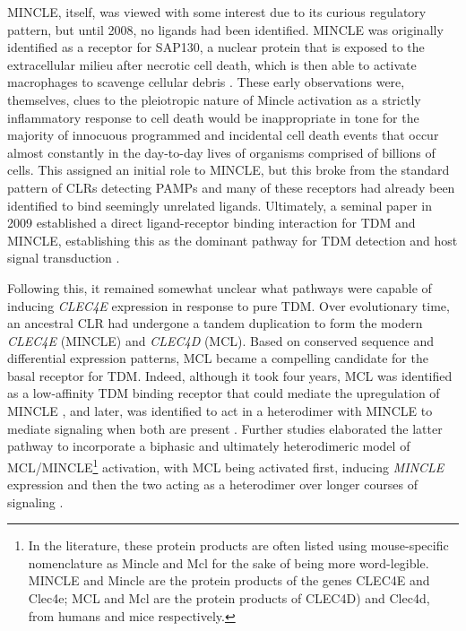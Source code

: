 MINCLE, itself, was viewed with some interest due to its curious regulatory pattern, but until 2008, no ligands had been identified. MINCLE was originally identified as a receptor for SAP130, a nuclear protein that is exposed to the extracellular milieu after necrotic cell death, which is then able to activate macrophages to scavenge cellular debris \citep{Yamasaki2008}. These early observations were, themselves, clues to the pleiotropic nature of Mincle activation as a strictly inflammatory response to cell death would be inappropriate in tone for the majority of innocuous programmed and incidental cell death events that occur almost constantly in the day-to-day lives of organisms comprised of billions of cells. This assigned an initial role to MINCLE, but this broke from the standard pattern of CLRs detecting PAMPs and many of these receptors had already been identified to bind seemingly unrelated ligands. Ultimately, a seminal paper in 2009 established a direct ligand-receptor binding interaction for TDM and MINCLE, establishing this as the dominant pathway for TDM detection and host signal transduction \citep{Ishikawa2009}. 

Following this, it remained somewhat unclear what pathways were capable of inducing \textit{CLEC4E} expression in response to pure TDM. Over evolutionary time, an ancestral CLR had undergone a tandem duplication to form the modern \textit{CLEC4E} (MINCLE) and \textit{CLEC4D} (MCL). Based on conserved sequence and differential expression patterns, MCL became a compelling candidate for the basal receptor for TDM. Indeed, although it took four years, MCL was identified as a low-affinity TDM binding receptor that could mediate the upregulation of MINCLE \citep{Miyake2013}, and later, was identified to act in a heterodimer with MINCLE to mediate signaling when both are present \citep{LobatoPascual2013, Kerscher2016, Yamasaki2013, Furukawa2013}. Further studies elaborated the latter pathway to incorporate a biphasic and ultimately heterodimeric model of MCL/MINCLE\footnote{In the literature, these protein products are often listed using mouse-specific nomenclature as Mincle and Mcl for the sake of being more word-legible. MINCLE and Mincle are the protein products of the genes CLEC4E and Clec4e; MCL and Mcl are the protein products of CLEC4D) and Clec4d, from humans and mice respectively.} activation, with MCL being activated first, inducing \textit{MINCLE} expression and then the two acting as a heterodimer over longer courses of signaling \citep{LobatoPascual2013, Yamasaki2013, Kurukawa2013}.

